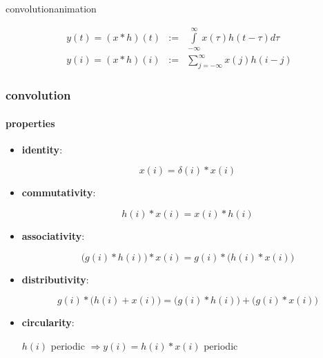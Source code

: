     \begin{frame}{convolution}{animation}
        \vspace{-5mm}
        \begin{footnotesize}
            \begin{eqnarray*}
                y(t) = (x \ast h)(t) &:=& \int\limits_{-\infty}^{\infty}x(\tau)h(t-\tau)d\tau\\
                y(i) = (x \ast h)(i) &:=& \sum\limits_{j=-\infty}^{\infty}x(j)h(i-j)
            \end{eqnarray*}
        \end{footnotesize}
    \end{frame}

        \begin{frame}\frametitle{convolution}\framesubtitle{properties}
            \begin{itemize}
                \item<1->	\textbf{identity}:
                        \begin{footnotesize}\begin{equation*}
                            x(i) = \delta(i)\ast x(i)
                        \end{equation*}\end{footnotesize}
                \item<2->	\textbf{commutativity}: 
                        \begin{footnotesize}\begin{equation*}
                            h(i) \ast x(i)	= x(i) \ast h(i) 
                        \end{equation*}\end{footnotesize}
                \item<3->	\textbf{associativity}:
                        \begin{footnotesize}\begin{equation*}
                            \big(g(i) \ast h(i)\big) \ast x(i) = g(i) \ast \big(h(i) \ast x(i)\big)
                        \end{equation*}\end{footnotesize}
                \item<4->	\textbf{distributivity}:
                            \begin{footnotesize}\begin{equation*}
                                g(i) \ast \big(h(i) + x(i)\big) = \big(g(i) \ast h(i)\big) + \big(g(i) \ast x(i)\big)
                            \end{equation*}\end{footnotesize}
                \item<5->	\textbf{circularity}:\\
                        \begin{footnotesize}
                        $h(i)$ periodic $\Rightarrow y(i) = h(i) \ast x(i)$ periodic
                        \end{footnotesize}
            \end{itemize}
        \end{frame}	

